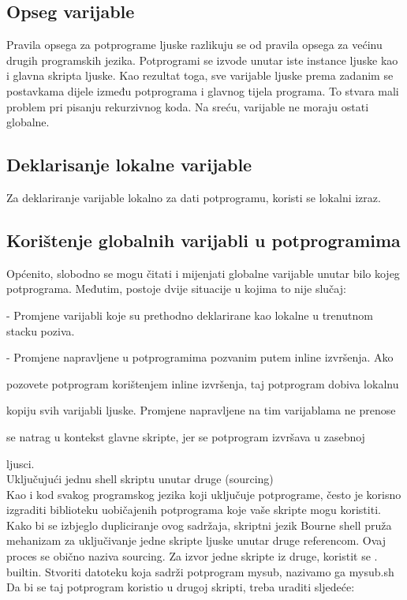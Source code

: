 \documentclass[11pt]{book}
\begin{document}
\subsection{Opseg varijable}
Pravila opsega za potprograme ljuske razlikuju se od pravila opsega za većinu drugih programskih jezika. Potprogrami se izvode unutar iste instance ljuske kao i glavna skripta ljuske. Kao rezultat toga, sve varijable ljuske prema zadanim se postavkama dijele između potprograma i glavnog tijela programa. To stvara mali problem pri pisanju rekurzivnog koda. Na sreću, varijable ne moraju ostati globalne.

\subsection{Deklarisanje lokalne varijable}
Za deklariranje varijable lokalno za dati potprogramu, koristi se lokalni izraz.\\


\subsection{Korištenje globalnih varijabli u potprogramima}

Općenito,  slobodno se mogu čitati i mijenjati globalne varijable unutar bilo kojeg potprograma. Međutim, postoje dvije situacije u kojima to nije slučaj: 

-	Promjene varijabli koje su prethodno deklarirane kao lokalne u trenutnom stacku poziva. 

-	Promjene napravljene u potprogramima pozvanim putem inline izvršenja. Ako

pozovete potprogram korištenjem inline izvršenja, taj potprogram dobiva lokalnu

kopiju svih varijabli ljuske. Promjene napravljene na tim varijablama ne prenose

se natrag u kontekst glavne skripte, jer se potprogram izvršava u zasebnoj

ljusci.\\ 

Uključujući jednu shell skriptu unutar druge (sourcing)\\
Kao i kod svakog programskog jezika koji uključuje potprograme, često je korisno izgraditi biblioteku uobičajenih potprograma koje vaše skripte mogu koristiti. Kako bi se izbjeglo dupliciranje ovog sadržaja, skriptni jezik Bourne shell pruža mehanizam za uključivanje jedne skripte ljuske unutar druge referencom. Ovaj proces se obično naziva sourcing. Za izvor jedne skripte iz druge, koristit se . builtin.
Stvoriti datoteku koja sadrži potprogram mysub, nazivamo ga mysub.sh Da bi se taj potprogram koristio u drugoj skripti, treba uraditi sljedeće:\\
\end{document}

